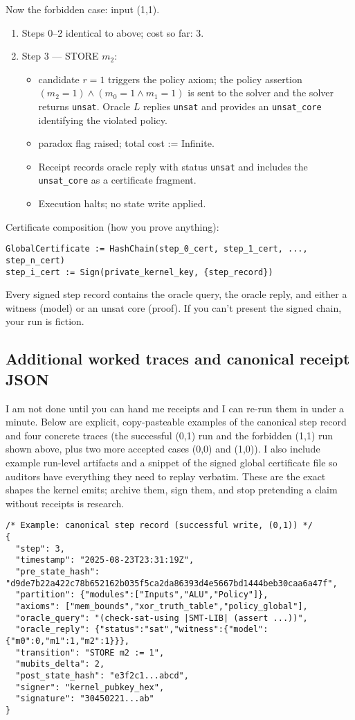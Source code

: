 \documentclass[11pt]{article}
\begin{document}
Now the forbidden case: input (1,1).
\begin{enumerate}
  \item Steps 0--2 identical to above; cost so far: 3.
  \item Step 3 — STORE $m_2$:
    \begin{itemize}
      \item candidate $r = 1$ triggers the policy axiom; the policy assertion $(m_2 = 1) \land (m_0 = 1 \land m_1 = 1)$ is sent to the solver and the solver returns \texttt{unsat}. Oracle $L$ replies \texttt{unsat} and provides an \texttt{unsat\_core} identifying the violated policy.
      \item paradox flag raised; total cost := Infinite.
      \item Receipt records oracle reply with status \texttt{unsat} and includes the \texttt{unsat\_core} as a certificate fragment.
      \item Execution halts; no state write applied.
    \end{itemize}
\end{enumerate}

Certificate composition (how you prove anything):
\begin{verbatim}
GlobalCertificate := HashChain(step_0_cert, step_1_cert, ..., step_n_cert)
step_i_cert := Sign(private_kernel_key, {step_record})
\end{verbatim}
Every signed step record contains the oracle query, the oracle reply, and either a witness (model) or an unsat core (proof). If you can’t present the signed chain, your run is fiction.

\subsection{Additional worked traces and canonical receipt JSON}
I am not done until you can hand me receipts and I can re-run them in under a minute. Below are explicit, copy-pasteable examples of the canonical step record and four concrete traces (the successful (0,1) run and the forbidden (1,1) run shown above, plus two more accepted cases (0,0) and (1,0)). I also include example run-level artifacts and a snippet of the signed global certificate file so auditors have everything they need to replay verbatim. These are the exact shapes the kernel emits; archive them, sign them, and stop pretending a claim without receipts is research.

\begin{verbatim}
/* Example: canonical step record (successful write, (0,1)) */
{
  "step": 3,
  "timestamp": "2025-08-23T23:31:19Z",
  "pre_state_hash": "d9de7b22a422c78b652162b035f5ca2da86393d4e5667bd1444beb30caa6a47f",
  "partition": {"modules":["Inputs","ALU","Policy"]},
  "axioms": ["mem_bounds","xor_truth_table","policy_global"],
  "oracle_query": "(check-sat-using |SMT-LIB| (assert ...))",
  "oracle_reply": {"status":"sat","witness":{"model":{"m0":0,"m1":1,"m2":1}}},
  "transition": "STORE m2 := 1",
  "mubits_delta": 2,
  "post_state_hash": "e3f2c1...abcd",
  "signer": "kernel_pubkey_hex",
  "signature": "30450221...ab"
}
\end{verbatim}
\end{document}
